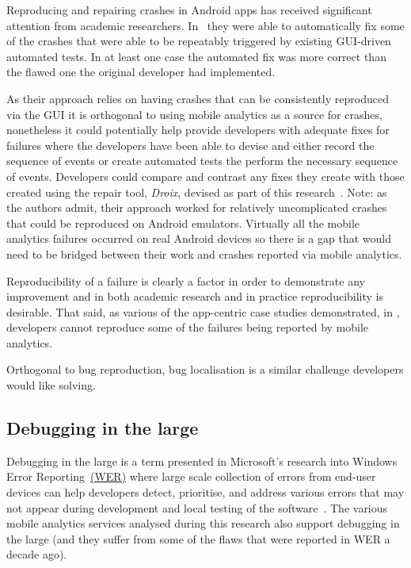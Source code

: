 Reproducing and repairing crashes in Android apps has received significant attention from academic researchers. In~ they were able to automatically fix some of the crashes that were able to be repeatably triggered by existing GUI-driven automated tests. In at least one case the automated fix was more correct than the flawed one the original developer had implemented. 

As their approach relies on having crashes that can be consistently reproduced via the GUI it is orthogonal to using mobile analytics as a source for crashes, nonetheless it could potentially help provide developers with adequate fixes for failures where the developers have been able to devise and either record the sequence of events or create automated tests the perform the necessary sequence of events. Developers could compare and contrast any fixes they create with those created using the repair tool, \textit{Droix}, devised as part of this research~. Note: as the authors admit, their approach worked for relatively uncomplicated crashes that could be reproduced on Android emulators. Virtually all the mobile analytics failures occurred on real Android devices so there is a gap that would need to be bridged between their work and crashes reported via mobile analytics.  

Reproducibility of a failure is clearly a factor in order to demonstrate any improvement and in both academic research and in practice reproducibility is desirable. That said, as various of the app-centric case studies demonstrated, in , developers cannot reproduce some of the failures being reported by mobile analytics. %

 Orthogonal to bug reproduction, bug localisation is a similar challenge developers would like solving. 


\subsection{Debugging in the large}
Debugging in the large is a term presented in Microsoft's research into Windows Error Reporting~\href{glossary-wer}{(WER)} where large scale collection of errors from end-user devices can help developers detect, prioritise, and address various errors that may not appear during development and local testing of the software~. The various mobile analytics services analysed during this research also support debugging in the large (and they suffer from some of the flaws that were reported in WER a decade ago). 

